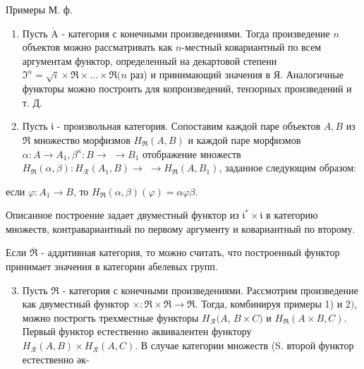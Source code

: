 \documentclass[10pt]{article}
\def\AA{\mathring{\mathrm{A}}}
\begin{document}
Примеры М. ф.



\begin{enumerate}

  \item Пусть $\mathscr{\AA}$ - категория с конечными произведениями. Тогда произведение $n$ объектов можно рассматривать как $n$-местный ковариантный по всем аргументам функтор, определенный на декартовой степени $\mathfrak{I}^{n}=\sqrt{i} \times \mathfrak{R} \times \ldots \times \mathfrak{R}(n$ раз) и принимающий значения в Я. Аналогичные функторы можно построить для копроизведений, тензорных произведений и т. Д.



  \item Пусть $\mathfrak{i}$ - произвольная категория. Сопоставим каждой паре объектов $A, B$ из $\mathfrak{\Re}$ множество морфизмов $H_{\Re}(A, B)$ и каждой паре морфизмов $\alpha: A \rightarrow A_{1}, \beta^{\kappa}: B \rightarrow$ $\rightarrow B_{1}$ отображение множеств $H_{\Re}(\alpha, \beta): H_{\mathscr{R}}\left(A_{1}, B\right) \rightarrow$ $\rightarrow H_{\Re}\left(A, B_{1}\right)$, заданное следующим образом:



\end{enumerate}



если $\varphi: A_{1} \longrightarrow B$, то $H_{\mathfrak{R}}(\alpha, \beta)(\varphi)=\alpha \varphi \beta$.



Описанное построение задает двуместный функтор из $\mathfrak{i}^{*} \times \mathfrak{i}$ в категорию множеств, контравариантный по первому аргументу и ковариантный по второму.



Если $\bar{\Re}$ - аддитивная категория, то можно считать, что построенный функтор принимает значения в категории абелевых групп.



\begin{enumerate}

  \setcounter{enumi}{2}

  \item Пусть $\Re$ - категория с конечными произведениями. Рассмотрим произведение как двуместный функтор $\times: \Re \times \Re \rightarrow \Re$. Тогда, комбинируя примеры 1) и 2$)$, можно построгть трехместные функторы $H_{\mathscr{R}}(A$, $B \times C)$ и $H_{\mathfrak{R}}(A \times B, C)$. Первый функтор естественно әквивалентен функтору $H_{\mathscr{R}}(A, B) \times H_{\mathscr{R}}(A, C)$. В случае категории множеств (S. второй функтор естественно әк-

\end{enumerate}
\end{document}
